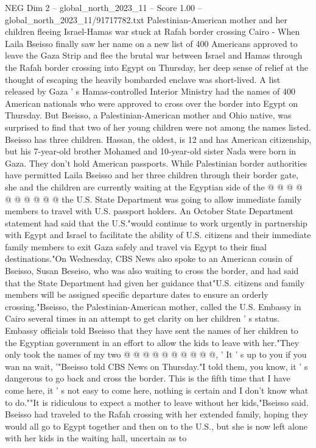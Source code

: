 \begin{textsample}{NEG Dim 2 – global\_north\_2023\_11 – Score 1.00 – global\_north\_2023\_11/91717782.txt}  \label{ex:f2_neg_139}
Palestinian-American mother and her children fleeing Israel-Hamas war stuck at Rafah border crossing Cairo - When Laila Bseisso finally saw her name on a new list of 400 Americans approved to leave the Gaza Strip and flee the brutal war between Israel and Hamas through the Rafah border crossing into Egypt on Thursday, her deep sense of relief at the thought of escaping the heavily bombarded enclave was short-lived.
A list released by Gaza ' s Hamas-controlled Interior Ministry had the names of 400 American nationals who were approved to cross over the border into Egypt on Thursday.
But Bseisso, a Palestinian-American mother and Ohio native, was surprised to find that two of her young children were not among the names listed.
Bseisso has three children.
Hassan, the oldest, is 12 and has American citizenship, but his 7-year-old brother Mohamed and 10-year-old sister Nada were born in Gaza.
They don't hold American passports.
While Palestinian border authorities have permitted Laila Bseisso and her three children through their border gate, she and the children are currently waiting at the Egyptian side of the @ @ @ @ @ @ @ @ @ @ the U.S.
State Department was going to allow immediate family members to travel with U.S. passport holders.
An October State Department statement had said that the U.S."would continue to work urgently in partnership with Egypt and Israel to facilitate the ability of U.S. citizens and their immediate family members to exit Gaza safely and travel via Egypt to their final destinations."On Wednesday, CBS News also spoke to an American cousin of Bseisso, Susan Beseiso, who was also waiting to cross the border, and had said that the State Department had given her guidance that"U.S. citizens and family members will be assigned specific departure dates to ensure an orderly crossing."Bseisso, the Palestinian-American mother, called the U.S.
Embassy in Cairo several times in an attempt to get clarity on her children ' s status.
Embassy officials told Bseisso that they have sent the names of her children to the Egyptian government in an effort to allow the kids to leave with her."They only took the names of my two @ @ @ @ @ @ @ @ @ @, ' It ' s up to you if you wan na wait, '"Bseisso told CBS News on Thursday."I told them, you know, it ' s dangerous to go back and cross the border.
This is the fifth time that I have come here, it ' s not easy to come here, nothing is certain and I don't know what to do.""It is ridiculous to expect a mother to leave without her kids,"Bseisso said.
Bseisso had traveled to the Rafah crossing with her extended family, hoping they would all go to Egypt together and then on to the U.S., but she is now left alone with her kids in the waiting hall, uncertain as to

\end{textsample}
